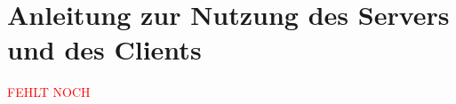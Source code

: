 \chapter{Anleitung zur Nutzung des Servers und des Clients}
\label{chapter:Anleitung}

\textcolor{red}{FEHLT NOCH}
